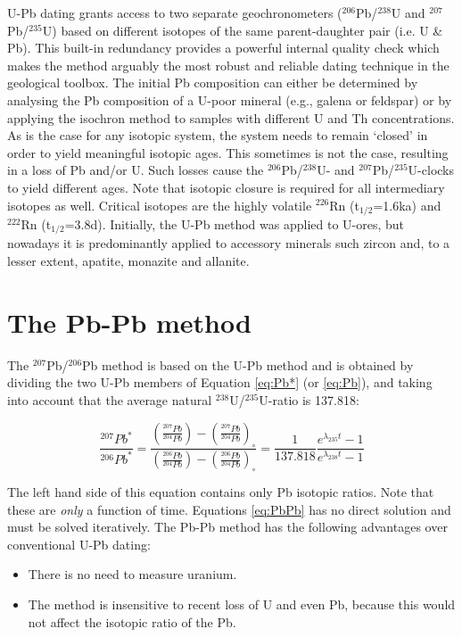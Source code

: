 \documentclass{book}
\begin{document}
U-Pb dating grants access to two separate geochronometers
($^{206}$Pb/${}^{238}$U and $^{207}$Pb/${}^{235}$U) based on different
isotopes of the same parent-daughter pair (i.e. U \& Pb).  This
built-in redundancy provides a powerful internal quality check which
makes the method arguably the most robust and reliable dating
technique in the geological toolbox. The initial Pb composition can
either be determined by analysing the Pb composition of a U-poor
mineral (e.g., galena or feldspar) or by applying the isochron method
to samples with different U and Th concentrations. As is the case for
any isotopic system, the system needs to remain `closed' in order to
yield meaningful isotopic ages.  This sometimes is not the case,
resulting in a loss of Pb and/or U.  Such losses cause the
$^{206}$Pb/$^{238}$U- and $^{207}$Pb/$^{235}$U-clocks to yield
different ages. Note that isotopic closure is required for all
intermediary isotopes as well.  Critical isotopes are the highly
volatile $^{226}$Rn (t$_{1/2}$=1.6ka) and $^{222}$Rn
(t$_{1/2}$=3.8d). Initially, the U-Pb method was applied to U-ores,
but nowadays it is predominantly applied to accessory minerals such
zircon and, to a lesser extent, apatite, monazite and allanite.

\section{The Pb-Pb method}
\label{sec:Pb-Pb}

The $^{207}$Pb/$^{206}$Pb method is based on the U-Pb method and is
obtained by dividing the two U-Pb members of Equation \ref{eq:Pb*} (or
\ref{eq:Pb}), and taking into account that the average natural
$^{238}$U/$^{235}$U-ratio is 137.818:

\begin{equation}
\frac{^{207}Pb^*}{^{206}Pb^*} = 
\frac{\left(\frac{^{207}Pb}{^{204}Pb}\right)-\left(\frac{^{207}Pb}{^{204}Pb}\right)_\circ}
{\left(\frac{^{206}Pb}{^{204}Pb}\right)-\left(\frac{^{206}Pb}{^{204}Pb}\right)_\circ}
= \frac{1}{137.818} \frac{e^{\lambda_{235}t}-1}{e^{\lambda_{238}t}-1}
\label{eq:PbPb}
\end{equation}

The left hand side of this equation contains only Pb isotopic ratios.
Note that these are \emph{only} a function of time. Equations
\ref{eq:PbPb} has no direct solution and must be solved
iteratively. The Pb-Pb method has the following advantages over
conventional U-Pb dating:

\begin{itemize}
\item There is no need to measure uranium.
\item The method is insensitive to recent loss of U and even Pb,
  because this would not affect the isotopic ratio of the Pb.
\end{itemize}
\end{document}
